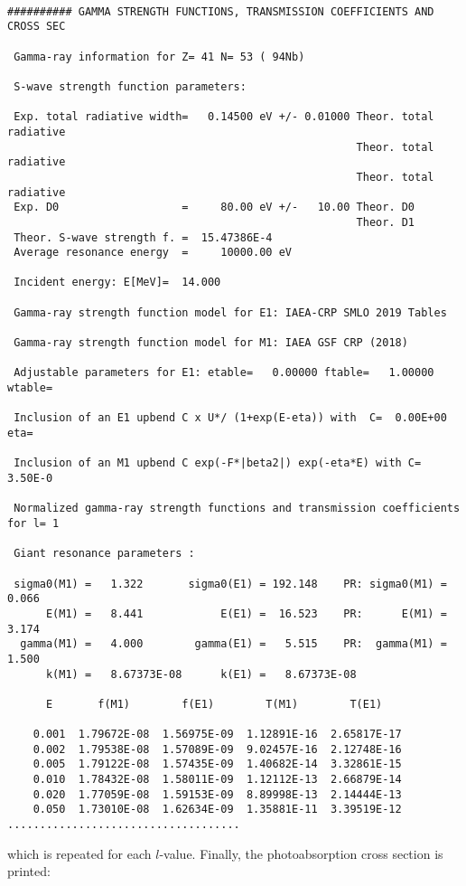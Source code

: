\begin{samplecase}
{\small \begin{verbatim}

########## GAMMA STRENGTH FUNCTIONS, TRANSMISSION COEFFICIENTS AND CROSS SEC

 Gamma-ray information for Z= 41 N= 53 ( 94Nb)

 S-wave strength function parameters:

 Exp. total radiative width=   0.14500 eV +/- 0.01000 Theor. total radiative 
                                                      Theor. total radiative 
                                                      Theor. total radiative 
 Exp. D0                   =     80.00 eV +/-   10.00 Theor. D0              
                                                      Theor. D1              
 Theor. S-wave strength f. =  15.47386E-4
 Average resonance energy  =     10000.00 eV

 Incident energy: E[MeV]=  14.000

 Gamma-ray strength function model for E1: IAEA-CRP SMLO 2019 Tables

 Gamma-ray strength function model for M1: IAEA GSF CRP (2018)

 Adjustable parameters for E1: etable=   0.00000 ftable=   1.00000 wtable=   

 Inclusion of an E1 upbend C x U*/ (1+exp(E-eta)) with  C=  0.00E+00 eta=   

 Inclusion of an M1 upbend C exp(-F*|beta2|) exp(-eta*E) with C=  3.50E-0

 Normalized gamma-ray strength functions and transmission coefficients for l= 1

 Giant resonance parameters :

 sigma0(M1) =   1.322       sigma0(E1) = 192.148    PR: sigma0(M1) =   0.066 
      E(M1) =   8.441            E(E1) =  16.523    PR:      E(M1) =   3.174 
  gamma(M1) =   4.000        gamma(E1) =   5.515    PR:  gamma(M1) =   1.500 
      k(M1) =   8.67373E-08      k(E1) =   8.67373E-08

      E       f(M1)        f(E1)        T(M1)        T(E1)

    0.001  1.79672E-08  1.56975E-09  1.12891E-16  2.65817E-17
    0.002  1.79538E-08  1.57089E-09  9.02457E-16  2.12748E-16
    0.005  1.79122E-08  1.57435E-09  1.40682E-14  3.32861E-15
    0.010  1.78432E-08  1.58011E-09  1.12112E-13  2.66879E-14
    0.020  1.77059E-08  1.59153E-09  8.89998E-13  2.14444E-13
    0.050  1.73010E-08  1.62634E-09  1.35881E-11  3.39519E-12
....................................
\end{verbatim} } \renewcommand{\baselinestretch}{1.07}\small\normalsize
\noindent
which is repeated for each $l$-value. Finally, the photoabsorption
cross section is printed:


\end{samplecase}
